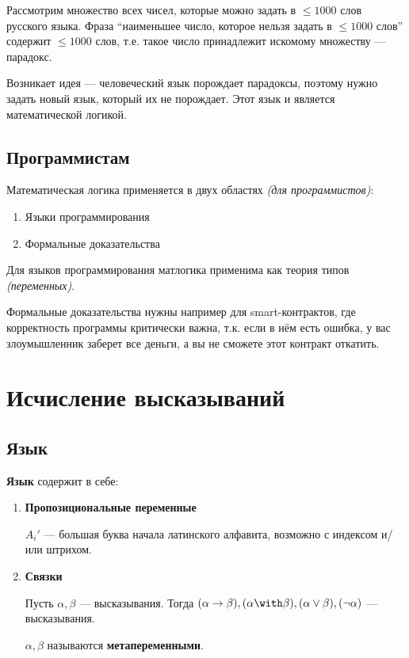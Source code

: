 \documentclass[12pt, a4paper, oneside]{book}
\begin{document}
\begin{example}
    Рассмотрим множество всех чисел, которые можно задать в \(\leq 1000\) слов русского языка. Фраза ``наименьшее число, которое нельзя задать в \( \leq 1000\) слов'' содержит \( \leq 1000\) слов, т.е. такое число принадлежит искомому множеству --- парадокс.
\end{example}

Возникает идея --- человеческий язык порождает парадоксы, поэтому нужно задать новый язык, который их не порождает. Этот язык и является математической логикой.

\subsection{Программистам}

Математическая логика применяется в двух областях \textit{(для программистов)}:
\begin{enumerate}
    \item Языки программирования
    \item Формальные доказательства
\end{enumerate}

Для языков программирования матлогика применима как теория типов \textit{(переменных)}.

Формальные доказательства нужны например для smart-контрактов, где корректность программы критически важна, т.к. если в нём есть ошибка, у вас злоумышленник заберет все деньги, а вы не сможете этот контракт откатить.

\section{Исчисление высказываний}

\subsection{Язык}

\begin{definition}\itemfix
    \textbf{Язык} содержит в себе:
    \begin{enumerate}
        \item \textbf{Пропозициональные переменные}

              \(A_i'\) --- большая буква начала латинского алфавита, возможно с индексом и/или штрихом.

        \item \textbf{Связки}

              Пусть \(\alpha, \beta\) --- высказывания. Тогда \((\alpha \to \beta), (\alpha \with \beta), (\alpha \lor \beta), (\neg \alpha)\) --- высказывания.

              \(\alpha,\beta\) называются \textbf{метапеременными}.
    \end{enumerate}
\end{definition}
\end{document}
